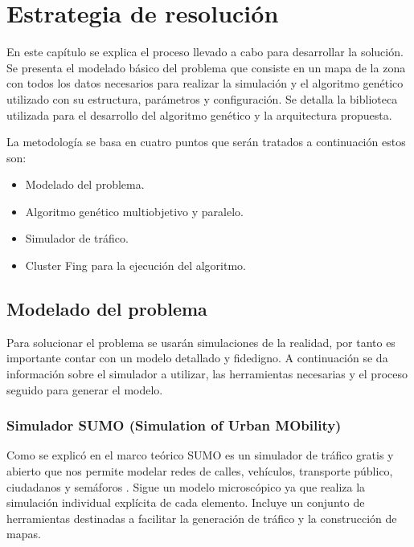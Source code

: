 \chapter{Estrategia de resolución}

En este capítulo se explica el proceso llevado a cabo para desarrollar la solución. Se presenta el modelado básico del problema que consiste en un mapa de la zona con todos los datos necesarios para realizar la simulación y el algoritmo genético utilizado con su estructura, parámetros y configuración. Se detalla la biblioteca utilizada para el desarrollo del algoritmo genético y la arquitectura propuesta.

La metodología se basa en cuatro puntos que serán tratados a continuación estos son:

\begin{itemize}
	\item Modelado del problema.
	\item Algoritmo genético multiobjetivo y paralelo.
	\item Simulador de tráfico.
	\item Cluster Fing para la ejecución del algoritmo. 
\end{itemize}





\section{Modelado del problema }

Para solucionar el problema se usarán simulaciones de la realidad, por tanto es importante contar con un modelo detallado y fidedigno. A continuación se da información sobre el simulador a utilizar, las herramientas necesarias y el proceso seguido para generar el modelo. 

\subsection{Simulador SUMO (Simulation of Urban MObility)}

Como se explicó en el marco teórico SUMO es un simulador de tráfico gratis y abierto que nos permite modelar redes de calles, vehículos, transporte público, ciudadanos y semáforos \citep{SUMO}. Sigue un modelo microscópico ya que realiza la simulación individual explícita de cada elemento. Incluye un conjunto de herramientas destinadas  a facilitar la generación de tráfico y la construcción de mapas. 


